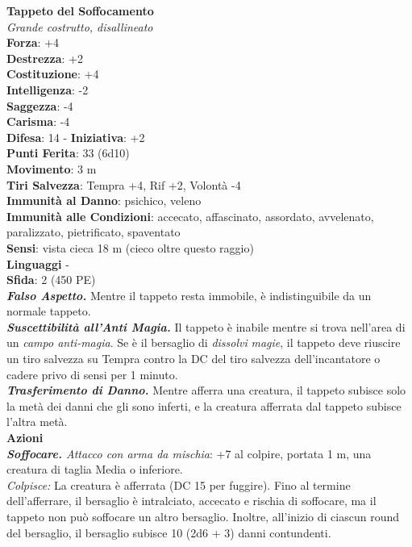 \begin{multicols}{2}
\medskip\textbf{Tappeto del Soffocamento}\\
\emph{Grande costrutto, disallineato}\\
\textbf{Forza}: +4\\
\textbf{Destrezza}: +2\\
\textbf{Costituzione}: +4\\
\textbf{Intelligenza}: -2\\
\textbf{Saggezza}: -4\\
\textbf{Carisma}: -4\\
\textbf{Difesa}: 14 - \textbf{Iniziativa}: +2\\
\textbf{Punti Ferita}: 33 (6d10)\\
\textbf{Movimento}: 3 m\\
\textbf{Tiri Salvezza}: Tempra +4, Rif +2, Volontà -4\\
\textbf{Immunità al Danno}: psichico, veleno\\
\textbf{Immunità alle Condizioni}: accecato, affascinato, assordato, avvelenato, paralizzato, pietrificato, spaventato\\
\textbf{Sensi}: vista cieca 18 m (cieco oltre questo raggio)\\
\textbf{Linguaggi} -\\
\textbf{Sfida}: 2 (450 PE)\smallskip\\
\emph{\textbf{Falso Aspetto.}} Mentre il tappeto resta immobile, è indistinguibile da un normale tappeto.\\

\emph{\textbf{Suscettibilità all'Anti Magia.}} Il tappeto è inabile mentre si trova nell'area di un \emph{campo anti-magia}. Se è il bersaglio di \emph{dissolvi} \emph{magie}, il tappeto deve riuscire un tiro salvezza su Tempra contro la DC del tiro salvezza dell'incantatore o cadere privo di sensi per 1 minuto.\\

\emph{\textbf{Trasferimento di Danno.}} Mentre afferra una creatura, il tappeto subisce solo la metà dei danni che gli sono inferti, e la creatura afferrata dal tappeto subisce l'altra metà.\\

\smallskip\textbf{Azioni}\\

\emph{\textbf{Soffocare.} Attacco con arma da mischia}: +7 al colpire, portata 1 m, una creatura di taglia Media o inferiore.\\

\emph{Colpisce:} La creatura è afferrata (DC  15 per fuggire). Fino al termine dell'afferrare, il bersaglio è intralciato, accecato e rischia di soffocare, ma il tappeto non può soffocare un altro bersaglio. Inoltre, all'inizio di ciascun round del bersaglio, il bersaglio subisce 10 (2d6 + 3) danni contundenti. 


\end{multicols}
